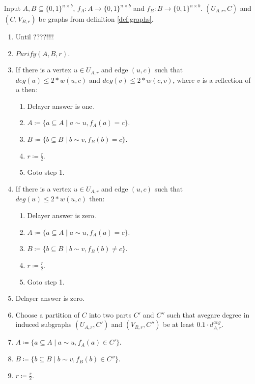 \begin{algorithm}
    Input $A, B \subseteq \{0, 1\}^{n \times b}$, $f_A: A \to \{0, 1\}^{n \times b}$ and $f_B: B \to
    \{0, 1\}^{n \times b}$. $(U_{A, r}, C)$ and $(C, V_{B, r})$ be graphs from definition
    \ref{def:graphs}.

    \begin{enumerate}
        \item Until ????!!!!
        \item $Purify(A, B, r)$.
        \item If there is a vertex $u \in U_{A, r}$ and edge $(u, c)$ such that $deg(u) \le 2 * w(u, c)$
            and $deg(v) \le 2 * w(c, v)$, where $v$ is a reflection of $u$ then:
            \begin{enumerate}
                \item Delayer answer is one.
                \item $A \coloneqq \{a \subseteq A \mid a \sim u, f_A(a) = c\}$.
                \item $B \coloneqq \{b \subseteq B \mid b \sim v, f_B(b) = c\}$.
                \item $r \coloneqq \frac{r}{2}$.
                \item Goto step 1.
            \end{enumerate}
        \item If there is a vertex $u \in U_{A, r}$ and edge $(u, c)$ such that $deg(u) \le 2 * w(u, c)$
            then:
            \begin{enumerate}
                \item Delayer answer is zero.
                \item $A \coloneqq \{a \subseteq A \mid a \sim u, f_A(a) = c\}$.
                \item $B \coloneqq \{b \subseteq B \mid b \sim v, f_B(b) \neq c\}$.
                \item $r \coloneqq \frac{r}{2}$.
                \item Goto step 1.
            \end{enumerate}
        \item Delayer answer is zero.
        \item Choose a partition of $C$ into two parts $C'$ and $C''$ such that avegare degree in induced
            subgraphs $(U_{A, r}, C')$ and $(V_{B, r}, C'')$ be at least $0.1 \cdot d_{A, r}^{avg}$.
        \item $A \coloneqq \{a \subseteq A \mid a \sim u, f_A(a) \in C'\}$.
        \item $B \coloneqq \{b \subseteq B \mid b \sim v, f_B(b) \in C''\}$.
        \item $r \coloneqq \frac{r}{2}$.
    \end{enumerate}
\end{algorithm}